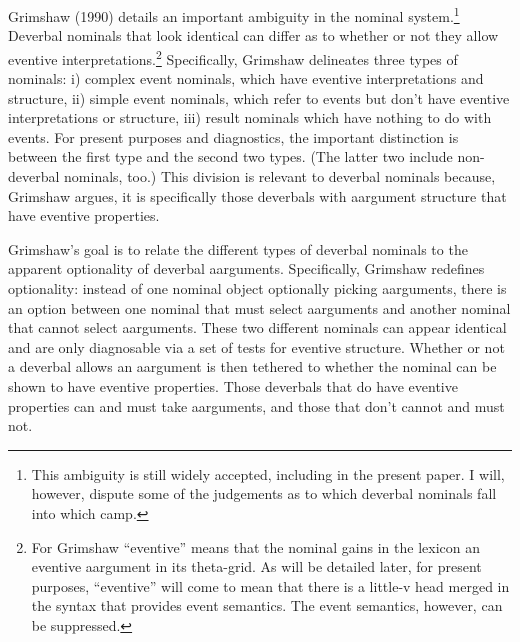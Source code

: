 \documentclass[12pt]{article}
\begin{document}
Grimshaw (1990) details an important ambiguity in the nominal system.\footnote{ This ambiguity is still widely accepted, including in the present paper. I will, however, dispute some of the judgements as to which deverbal nominals fall into which camp.} Deverbal nominals that look identical can differ as to whether or not they allow eventive interpretations.\footnote{ For Grimshaw ``eventive'' means that the nominal gains in the lexicon an eventive aargument in its theta-grid. As will be detailed later, for present purposes, ``eventive'' will come to mean that there is a little-v head merged in the syntax that provides event semantics. The event semantics, however, can be suppressed.} Specifically, Grimshaw delineates three types of nominals: i) complex event nominals, which have eventive interpretations and structure, ii) simple event nominals, which refer to events but don't have eventive interpretations or structure, iii) result nominals which have nothing to do with events. For present purposes and diagnostics, the important distinction is between the first type and the second two types. (The latter two include non-deverbal nominals, too.) This division is relevant to deverbal nominals because, Grimshaw argues, it is specifically those deverbals with aargument structure that have eventive properties.

Grimshaw's goal is to relate the different types of deverbal nominals to the apparent optionality of deverbal aarguments. Specifically, Grimshaw redefines optionality: instead of one nominal object optionally picking aarguments, there is an option between one nominal that must select aarguments and another nominal that cannot select aarguments. These two different nominals can appear identical and are only diagnosable via a set of tests for eventive structure. Whether or not a deverbal allows an aargument is then tethered to whether the nominal can be shown to have eventive properties. Those deverbals that do have eventive properties can and must take aarguments, and those that don't cannot and must not. 
\end{document}
